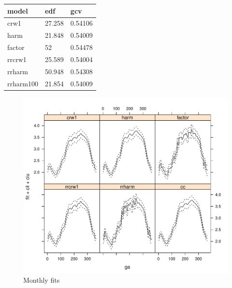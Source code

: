\begin{table}[ht]
\label{tab:chptr4:efd}
\centering
\begin{tabular}{l|l|l}
\hline
model & edf & gcv\\
\hline
crw1 & 27.258 & 0.54106\\
\hline
harm & 21.848 & 0.54009\\
\hline
factor & 52 & 0.54478\\
\hline
rrcrw1 & 25.589 & 0.54004\\
\hline
rrharm & 50.948 & 0.54308\\
\hline
rrharm100 & 21.854 & 0.54009\\
\hline
\end{tabular}
\end{table}



\begin{figure}
  \centering
  \includegraphics[width=\textwidth]{smoothChoice}
\caption{Monthly fits}
\label{fig:chptr4:smoothchoice}
\end{figure}





